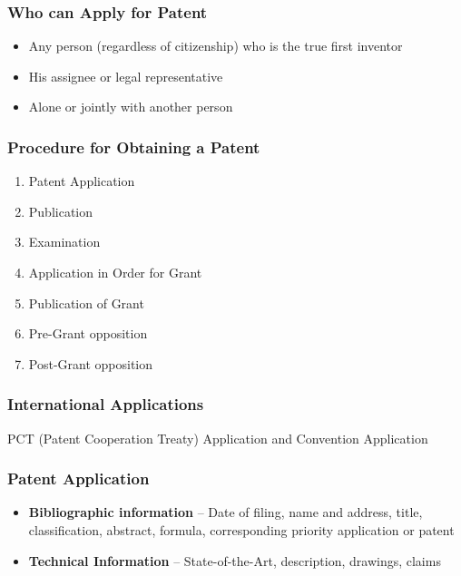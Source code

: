 \documentclass{article}
\begin{document}
\subsubsection{Who can Apply for Patent}

\begin{itemize}
    \item Any person (regardless of citizenship) who is the true first inventor
    \item His assignee or legal representative
    \item Alone or jointly with another person
\end{itemize}

\subsubsection{Procedure for Obtaining a Patent}

\begin{enumerate}
    \item Patent Application
    \item Publication
    \item Examination
    \item Application in Order for Grant
    \item Publication of Grant
    \item Pre-Grant opposition
    \item Post-Grant opposition
\end{enumerate}

\subsubsection{International Applications}

PCT (Patent Cooperation Treaty) Application and Convention Application

\subsubsection{Patent Application}

\begin{itemize}
    \item \textbf{Bibliographic information} -- Date of filing, name and address, title, classification, abstract, formula, corresponding priority application or patent
    \item \textbf{Technical Information} -- State-of-the-Art, description, drawings, claims
\end{itemize}
\end{document}

